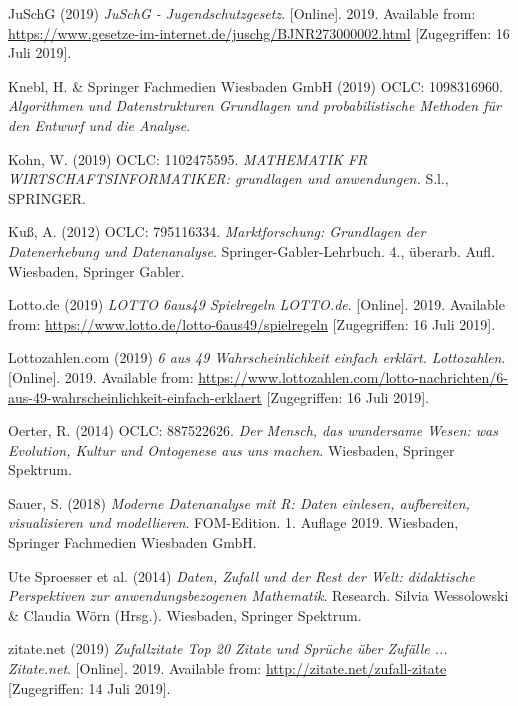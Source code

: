 \documentclass[ngerman,]{article}
\begin{document}
\hypertarget{ref-juschg_juschg_2019}{}
JuSchG (2019) \emph{JuSchG - Jugendschutzgesetz}. {[}Online{]}. 2019.
Available from:
\url{https://www.gesetze-im-internet.de/juschg/BJNR273000002.html}
{[}Zugegriffen: 16 Juli 2019{]}.

\hypertarget{ref-knebl_algorithmen_2019}{}
Knebl, H. \& Springer Fachmedien Wiesbaden GmbH (2019) OCLC: 1098316960.
\emph{Algorithmen und Datenstrukturen Grundlagen und probabilistische
Methoden für den Entwurf und die Analyse}.

\hypertarget{ref-kohn_mathematik_2019}{}
Kohn, W. (2019) OCLC: 1102475595. \emph{MATHEMATIK FR
WIRTSCHAFTSINFORMATIKER: grundlagen und anwendungen.} S.l., SPRINGER.

\hypertarget{ref-kus_marktforschung:_2012}{}
Kuß, A. (2012) OCLC: 795116334. \emph{Marktforschung: Grundlagen der
Datenerhebung und Datenanalyse}. Springer-Gabler-Lehrbuch. 4., überarb.
Aufl. Wiesbaden, Springer Gabler.

\hypertarget{ref-lotto.de_lotto_2019}{}
Lotto.de (2019) \emph{LOTTO 6aus49 Spielregeln LOTTO.de}. {[}Online{]}.
2019. Available from:
\url{https://www.lotto.de/lotto-6aus49/spielregeln} {[}Zugegriffen: 16
Juli 2019{]}.

\hypertarget{ref-lottozahlen.com_6_2019}{}
Lottozahlen.com (2019) \emph{6 aus 49 Wahrscheinlichkeit einfach
erklärt. Lottozahlen}. {[}Online{]}. 2019. Available from:
\url{https://www.lottozahlen.com/lotto-nachrichten/6-aus-49-wahrscheinlichkeit-einfach-erklaert}
{[}Zugegriffen: 16 Juli 2019{]}.

\hypertarget{ref-oerter_mensch_2014}{}
Oerter, R. (2014) OCLC: 887522626. \emph{Der Mensch, das wundersame
Wesen: was Evolution, Kultur und Ontogenese aus uns machen}. Wiesbaden,
Springer Spektrum.

\hypertarget{ref-sauer_moderne_2018}{}
Sauer, S. (2018) \emph{Moderne Datenanalyse mit R: Daten einlesen,
aufbereiten, visualisieren und modellieren}. FOM-Edition. 1. Auflage
2019. Wiesbaden, Springer Fachmedien Wiesbaden GmbH.

\hypertarget{ref-ute_sproesser_et_al._daten_2014}{}
Ute Sproesser et al. (2014) \emph{Daten, Zufall und der Rest der Welt:
didaktische Perspektiven zur anwendungsbezogenen Mathematik}. Research.
Silvia Wessolowski \& Claudia Wörn (Hrsg.). Wiesbaden, Springer
Spektrum.

\hypertarget{ref-zitate.net_zufallzitate_2019}{}
zitate.net (2019) \emph{Zufallzitate Top 20 Zitate und Sprüche über
Zufälle ... Zitate.net}. {[}Online{]}. 2019. Available from:
\url{http://zitate.net/zufall-zitate} {[}Zugegriffen: 14 Juli 2019{]}.
\end{document}

